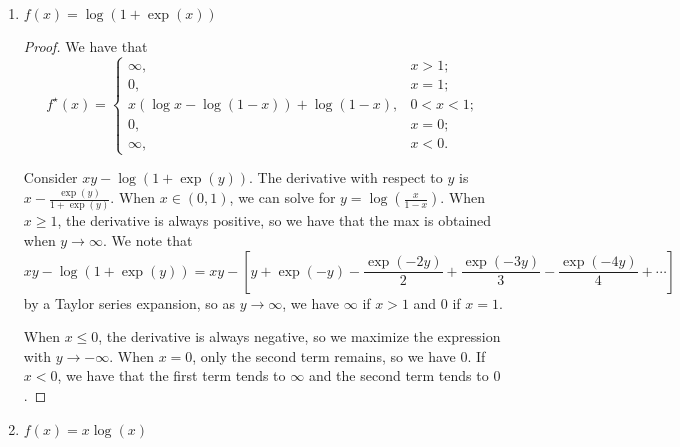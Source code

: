 \documentclass[11pt]{amsart}
\begin{document}
\begin{enumerate}
\begin{enumerate}
\begin{proof}
    To see this, we can maximize
    $\left\langle x, y \right\rangle - \exp\left(y\right)$ with respect to $y$
    by taking the derivative, setting it to $0$, and solving for $y$. In doing
    so, we find that $y = \log x$, which is only defined when $x > 0$. When
    $x \leq 0$, we see that we can maximize $xy - \exp\left(y\right)$ by sending
    $y$ to $-\infty$.
  \end{proof}
\item $f(x) =  \log(1+\exp(x))$
  \begin{proof}
    We have that
    \begin{equation*}
      \boxed{f^\star(x) =
        \begin{cases}
          \infty, &x > 1; \\
          0, &x = 1; \\
          x\left(\log x - \log\left(1 - x\right)\right)  + \log\left(1 - x\right), & 0 < x < 1; \\
          0, & x = 0; \\
          \infty, &x < 0.
        \end{cases}}
    \end{equation*}

    Consider $xy - \log(1+\exp(y))$. The derivative with respect to $y$ is
    $x - \frac{\exp(y)}{1+\exp(y)}$. When $x \in \left(0, 1\right)$, we can
    solve for $y = \log\left(\frac{x}{1 - x}\right)$. When $x \geq 1$, the
    derivative is always positive, so we have that the max is obtained when
    $y \rightarrow \infty$. We note that
    \begin{equation*}
      xy - \log(1+\exp(y)) = xy - \left[
        y + \exp(-y) - \frac{\exp(-2y)}{2} + \frac{\exp(-3y)}{3} - \frac{\exp(-4y)}{4} + \cdots
      \right]
    \end{equation*}
    by a Taylor series expansion, so as $y \rightarrow \infty$, we have $\infty$
    if $x > 1$ and $0$ if $x = 1$.

    When $x \leq 0$, the derivative is always negative, so we maximize the
    expression with $y \rightarrow -\infty$. When $x = 0$, only the second term
    remains, so we have $0$. If $x < 0$, we have that the first term tends to
    $\infty$ and the second term tends to $0$.        
  \end{proof}
\item $f(x) = x\log(x)$
\end{enumerate}


\bigskip\bigskip




\end{enumerate}
\end{document}

